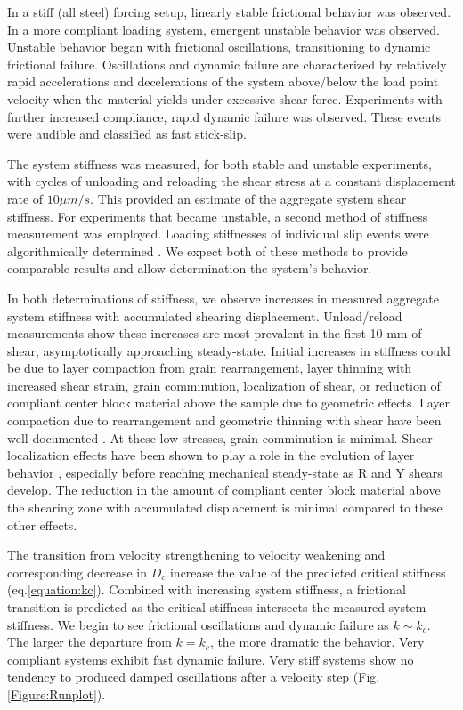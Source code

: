 \documentclass[11pt]{article}
\begin{document}
In a stiff (all steel) forcing setup, linearly stable frictional behavior was observed.
In a more compliant loading system, emergent unstable behavior was observed.
Unstable behavior began with frictional oscillations, transitioning to dynamic frictional
failure. Oscillations and dynamic failure are characterized by relatively rapid
accelerations and decelerations of the system above/below the load point
velocity when the material yields under excessive shear force. Experiments with
further increased compliance, rapid dynamic failure was observed. These events
were audible and classified as fast stick-slip.

The system stiffness was measured, for both stable and unstable experiments, with
cycles of unloading and reloading the shear stress at a constant displacement rate of $10 \mu m/s$.  This provided an estimate
of the aggregate system shear stiffness. For experiments that became unstable,
a second method of stiffness measurement was employed. Loading stiffnesses of
individual slip events were algorithmically determined \cite{Leeman:2015}. We expect both
of these methods to provide comparable results and allow determination the system's behavior.

In both determinations of stiffness, we observe increases in measured aggregate
system stiffness with accumulated shearing displacement. Unload/reload measurements show these increases are most
prevalent in the first 10 mm of shear, asymptotically approaching steady-state.
Initial increases in stiffness could be due to layer compaction from
grain rearrangement, layer thinning with increased shear strain, grain
comminution, localization of shear, or reduction of
compliant center block material above the sample due to geometric effects.
Layer compaction due to rearrangement and geometric thinning with shear
have been well documented \cite{Scott:1994}.  At these low stresses, grain
comminution is minimal. Shear localization effects have been shown to play a role in the
evolution of layer behavior \cite{Logan:1992}, especially before reaching mechanical
steady-state as R and Y shears develop. The reduction in the amount of
compliant center block material above the shearing zone with accumulated
displacement is minimal compared to these other effects.

The transition from velocity strengthening to velocity weakening and
corresponding decrease in $D_c$ increase the value of the predicted critical
stiffness (eq.\ref{equation:kc}). Combined with increasing system stiffness,
a frictional transition is predicted as the critical stiffness intersects the
measured system stiffness. We begin to see frictional oscillations and dynamic
failure as $k \sim k_c$. The larger the departure from $k=k_c$, the more dramatic the behavior.
Very compliant systems exhibit fast dynamic failure. Very stiff systems show no
tendency to produced damped oscillations after a
velocity step (Fig.\ref{Figure:Runplot}).
\end{document}
